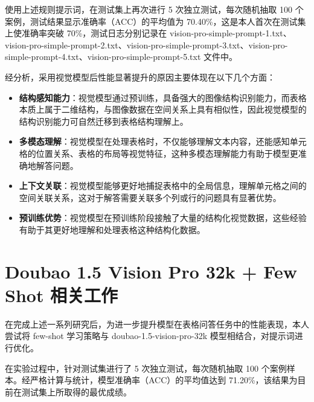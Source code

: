 \documentclass[10.5pt,compsoc]{CjC}
\theoremstyle{mystyle}
\begin{document}
\begin{CJK*}{UTF8}{zhhei}
使用上述规则提示词，在测试集上再次进行 5 次独立测试，每次随机抽取 100 个案例，测试结果显示准确率（ACC）的平均值为 70.40\%，这是本人首次在测试集上使准确率突破 70\%，测试日志分别记录在 vision-pro-simple-prompt-1.txt、vision-pro-simple-prompt-2.txt、vision-pro-simple-prompt-3.txt、vision-pro-simple-prompt-4.txt、vision-pro-simple-prompt-5.txt 文件中。

经分析，采用视觉模型后性能显著提升的原因主要体现在以下几个方面：

\begin{itemize}
  \item \textbf{结构感知能力}：视觉模型通过预训练，具备强大的图像结构识别能力，而表格本质上属于二维结构，与图像数据在空间关系上具有相似性，因此视觉模型的结构识别能力可自然迁移到表格结构理解上。
  \item \textbf{多模态理解}：视觉模型在处理表格时，不仅能够理解文本内容，还能感知单元格的位置关系、表格的布局等视觉特征，这种多模态理解能力有助于模型更准确地解答问题。
  \item \textbf{上下文关联}：视觉模型能够更好地捕捉表格中的全局信息，理解单元格之间的空间关联关系，这对于解答需要关联多个列或行的问题具有显著优势。
  \item \textbf{预训练优势}：视觉模型在预训练阶段接触了大量的结构化视觉数据，这些经验有助于其更好地理解和处理表格这种结构化数据。
\end{itemize}

\section{Doubao 1.5 Vision Pro 32k + Few Shot 相关工作}
在完成上述一系列研究后，为进一步提升模型在表格问答任务中的性能表现，本人尝试将 few-shot 学习策略与 doubao-1.5-vision-pro-32k 模型相结合，对提示词进行优化。

在实验过程中，针对测试集进行了 5 次独立测试，每次随机抽取 100 个案例样本。经严格计算与统计，模型准确率（ACC）的平均值达到 71.20\%，该结果为目前在测试集上所取得的最优成绩。





\end{CJK*}
\end{document}
